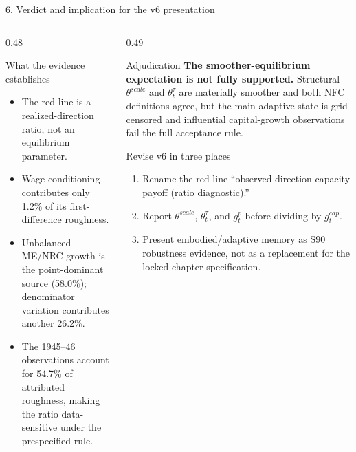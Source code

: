 \documentclass[10pt,aspectratio=169]{beamer}
\begin{document}
\begin{frame}{6. Verdict and implication for the v6 presentation}
  \begin{columns}[T,onlytextwidth]
    \begin{column}{0.48\textwidth}
      \begin{block}{What the evidence establishes}
        \small
        \begin{itemize}
          \item The red line is a realized-direction ratio, not an equilibrium parameter.
          \item Wage conditioning contributes only 1.2\% of its first-difference roughness.
          \item Unbalanced ME/NRC growth is the point-dominant source (58.0\%); denominator variation contributes another 26.2\%.
          \item The 1945--46 observations account for 54.7\% of attributed roughness, making the ratio data-sensitive under the prespecified rule.
        \end{itemize}
      \end{block}
    \end{column}
    \begin{column}{0.49\textwidth}
      \begin{alertblock}{Adjudication}
        \small
        \textbf{The smoother-equilibrium expectation is not fully supported.}
        Structural $\theta^{scale}$ and $\theta_t^{\tau}$ are materially smoother and both NFC definitions agree, but the main adaptive state is grid-censored and influential capital-growth observations fail the full acceptance rule.
      \end{alertblock}
      \begin{block}{Revise v6 in three places}
        \small
        \begin{enumerate}
          \item Rename the red line ``observed-direction capacity payoff (ratio diagnostic).''
          \item Report $\theta^{scale}$, $\theta_t^{\tau}$, and $g_t^p$ before dividing by $g_t^{cap}$.
          \item Present embodied/adaptive memory as S90 robustness evidence, not as a replacement for the locked chapter specification.
        \end{enumerate}
      \end{block}
    \end{column}
  \end{columns}
\end{frame}
\end{document}
